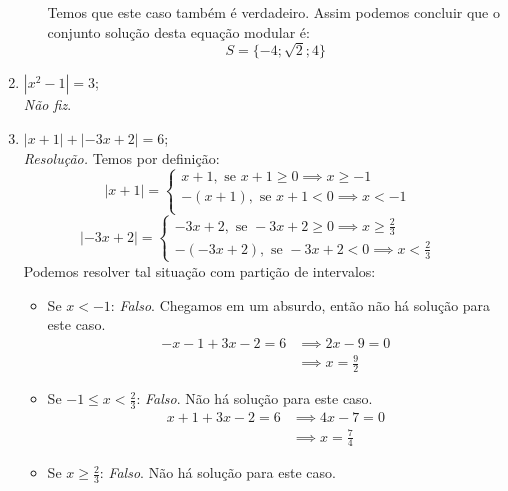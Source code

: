 \begin{enumerate}
\begin{itemize}
        Temos que este caso também é verdadeiro. Assim podemos concluir que o conjunto solução desta equação modular é:
        \begin{displaymath}
            S = \{-4; \sqrt{2}; 4\}
        \end{displaymath}
    \end{itemize}
    \item $|x^2 - 1| = 3$;
    \\ \emph{Não fiz}.
    \item $|x + 1| + |-3x + 2| = 6$;
    \\ \emph{Resolução.} Temos por definição:
    \begin{displaymath}
        |x + 1| = \left\{\begin{array}{cc}
             x + 1, \text{ se } x + 1 \ge 0 \implies x \ge -1&  \\
             -(x + 1), \text{ se } x + 1 < 0 \implies x < -1&  \\
        \end{array} \right.
        \end{displaymath}
        \begin{displaymath}
        |-3x + 2| = \left\{\begin{array}{cc}
             -3x + 2, \text{ se } -3x + 2 \ge 0 \implies x \ge \frac{2}{3} &  \\
             -(-3x + 2), \text{ se } -3x + 2 < 0\implies x < \frac{2}{3}& 
        \end{array} \right.
    \end{displaymath}
    Podemos resolver tal situação com partição de intervalos:
    \begin{itemize}
        \item Se $x < -1$: \emph{Falso}. Chegamos em um absurdo, então não há solução para este caso.
        \begin{align*}
            -x - 1 + 3x - 2 = 6 & \implies 2x - 9 = 0 \\ & \implies x = \frac{9}{2}
        \end{align*}
        \item Se $-1 \le x < \frac{2}{3}$: \emph{Falso}. Não há solução para este caso.
        \begin{align*}
            x + 1 + 3x - 2 = 6 & \implies 4x - 7 = 0 \\ & \implies x = \frac{7}{4}
        \end{align*}
        \item Se $x \ge \frac{2}{3}$: \emph{Falso}. Não há solução para este caso.

\end{itemize}
\end{enumerate}
